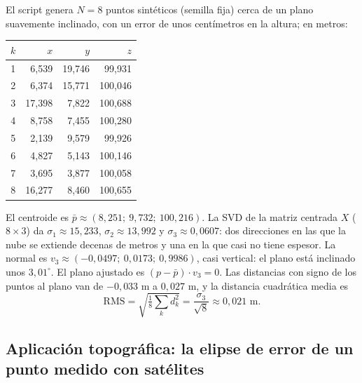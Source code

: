 \begin{ejemplo}\label{ej:svd-plano}
El script genera \(N=8\) puntos sintéticos (semilla fija) cerca de un plano suavemente
inclinado, con un error de unos centímetros en la altura; en metros:
\begin{center}
\small
\begin{tabular}{crrr}
\toprule
\(k\) & \(x\) & \(y\) & \(z\)\\
\midrule
1 & 6{,}539 & 19{,}746 & 99{,}931\\
2 & 6{,}374 & 15{,}771 & 100{,}046\\
3 & 17{,}398 & 7{,}822 & 100{,}688\\
4 & 8{,}758 & 7{,}455 & 100{,}280\\
5 & 2{,}139 & 9{,}579 & 99{,}926\\
6 & 4{,}827 & 5{,}143 & 100{,}146\\
7 & 3{,}695 & 3{,}877 & 100{,}058\\
8 & 16{,}277 & 8{,}460 & 100{,}655\\
\bottomrule
\end{tabular}
\end{center}
El centroide es \(\bar p\approx(8{,}251;\ 9{,}732;\ 100{,}216)\). La SVD de la matriz
centrada \(X\) (\(8\times3\)) da \(\sigma_1\approx15{,}233\), \(\sigma_2\approx13{,}992\) y
\(\sigma_3\approx0{,}0607\): dos direcciones en las que la nube se extiende decenas de metros
y una en la que casi no tiene espesor. La normal es \(v_3\approx(-0{,}0497;\ 0{,}0173;\
0{,}9986)\), casi vertical: el plano está inclinado unos \(3{,}01^\circ\). El plano ajustado es
\((p-\bar p)\cdot v_3=0\). Las distancias con signo de los puntos al plano van de
\(-0{,}033\) m a \(0{,}027\) m, y la distancia cuadrática media es
\[
  \text{RMS}=\sqrt{\tfrac18\textstyle\sum_k d_k^2}=\frac{\sigma_3}{\sqrt8}\approx0{,}021\text{ m}.
\]
\end{ejemplo}

\subsection{Aplicación topográfica: la elipse de error de un punto medido con satélites}

